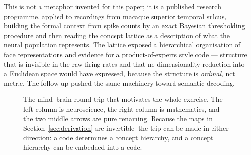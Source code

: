 This is not a metaphor invented for this paper; it is a published research
programme. \citet{endres2008} applied \fca{} to recordings from macaque
superior temporal sulcus, building the formal context from spike counts by an
exact Bayesian thresholding procedure and then reading the concept lattice as
a description of what the neural population represents. The lattice exposed a
hierarchical organisation of face representations and evidence for a
product-of-experts style code --- structure that is invisible in the raw
firing rates and that no dimensionality reduction into a Euclidean space would
have expressed, because the structure is \emph{ordinal}, not metric. The
follow-up \citep{endres2010} pushed the same machinery toward semantic
decoding.

\begin{figure}[t]
\centering
{}
\caption{The mind--brain round trip that motivates the whole exercise. The
left column is neuroscience, the right column is mathematics, and the two
middle arrows are pure renaming. Because the maps in
Section~\ref{sec:derivation} are invertible, the trip can be made in either
direction: a code determines a concept hierarchy, and a concept hierarchy can
be embedded into a code.}
\label{fig:mind-brain}
\end{figure}


